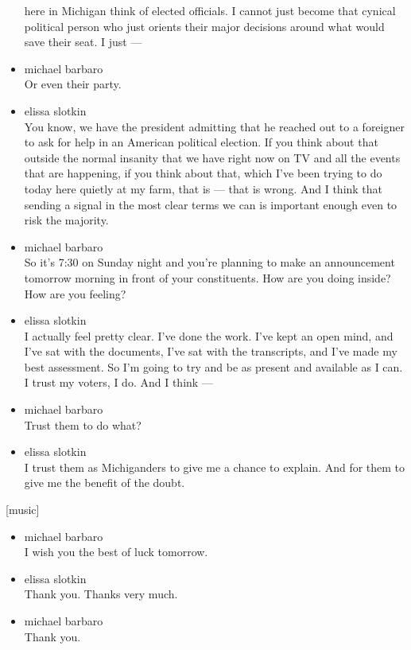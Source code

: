 \begin{itemize}
  here in Michigan think of elected officials. I cannot just become that
  cynical political person who just orients their major decisions around
  what would save their seat. I just ---
\item
  michael barbaro\\
  Or even their party.
\item
  elissa slotkin\\
  You know, we have the president admitting that he reached out to a
  foreigner to ask for help in an American political election. If you
  think about that outside the normal insanity that we have right now on
  TV and all the events that are happening, if you think about that,
  which I've been trying to do today here quietly at my farm, that is
  --- that is wrong. And I think that sending a signal in the most clear
  terms we can is important enough even to risk the majority.
\item
  michael barbaro\\
  So it's 7:30 on Sunday night and you're planning to make an
  announcement tomorrow morning in front of your constituents. How are
  you doing inside? How are you feeling?
\item
  elissa slotkin\\
  I actually feel pretty clear. I've done the work. I've kept an open
  mind, and I've sat with the documents, I've sat with the transcripts,
  and I've made my best assessment. So I'm going to try and be as
  present and available as I can. I trust my voters, I do. And I think
  ---
\item
  michael barbaro\\
  Trust them to do what?
\item
  elissa slotkin\\
  I trust them as Michiganders to give me a chance to explain. And for
  them to give me the benefit of the doubt.
\end{itemize}

{[}music{]}

\begin{itemize}
\item
  michael barbaro\\
  I wish you the best of luck tomorrow.
\item
  elissa slotkin\\
  Thank you. Thanks very much.
\item
  michael barbaro\\
  Thank you.
\end{itemize}

